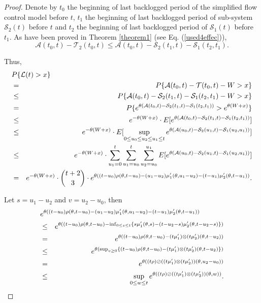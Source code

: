 \documentclass[12pt]{article}
\newtheorem{proof}{Proof}
\begin{document}
\begin{proof}
Denote by $t_0$ the beginning of last backlogged period of the simplified flow control model before $t$, $t_1$ the beginning of last backlogged period of sub-system $\mathcal{S}_2(t)$ before $t$ and $t_2$ the beginning of last backlogged period of $\mathcal{S}_1(t)$ before $t_1$. As have been proved in Theorem \ref{theorem1} (see Eq. (\ref{used4effec})),
$$\mathcal{A}(t_0,t)-\mathcal{T}_2(t_0,t) \leq \mathcal{A}(t_0,t)-\mathcal{S}_2(t_1,t)-\mathcal{S}_1(t_2,t_1).$$

Thus,
\begin{eqnarray*}
\lefteqn{P\{\mathcal{L}(t)>x\}}\\
&=&P\{\mathcal{A}(t_0,t)-\mathcal{T}(t_0,t)-W>x\}\\
&\leq&P\{\mathcal{A}(t_0,t)-\mathcal{S}_2(t_1,t)-\mathcal{S}_1(t_2,t_1)-W>x\}\\
&=&P\{e^{\theta(\mathcal{A}(t_0,t)-\mathcal{S}_2(t_1,t)-\mathcal{S}_1(t_2,t_1))}>e^{\theta(W+x)}\}\\
&\leq& e^{-\theta (W+x)}\cdot E[e^{\theta(\mathcal{A}(t_0,t)-\mathcal{S}_2(t_1,t)-\mathcal{S}_1(t_2,t_1))}]\\
&\leq& e^{-\theta (W+x)}\cdot E[\sup_{0\leq u_0\leq u_2\leq u_1\leq t}e^{\theta(\mathcal{A}(u_0,t)-\mathcal{S}_2(u_1,t)-\mathcal{S}_1(u_2,u_1))}]\\
&\leq& e^{-\theta (W+x)}\cdot \sum_{u_1=0}^t\sum_{u_1=u_0} ^t\sum_{u_2=u_0}^{u_1}E[e^{\theta(\mathcal{A}(u_0,t)-\mathcal{S}_2(u_1,t)-\mathcal{S}_1(u_2,u_1))}]\\
&=& e^{-\theta (W+x)}\cdot {t+2\choose 3}\cdot e^{\theta((t-u_0)\rho(\theta,t-u_0)-(u_1-u_2)\mu_1^\prime(\theta,u_1-u_2)-(t-u_1)\mu_2^\prime(\theta,t-u_1))}.
\end{eqnarray*}

Let $s=u_1-u_2$ and $v=u_2-u_0$, then
\begin{eqnarray*}
\lefteqn{e^{\theta((t-u_0)\rho(\theta,t-u_0)-(u_1-u_2)\mu_1^\prime(\theta,u_1-u_2)-(t-u_1)\mu_2^\prime(\theta,t-u_1))}}\\
&\leq & e^{\theta((t-u_0)\rho(\theta,t-u_0)-\inf_{0\leq s\leq t}\{s\mu_1^\prime(\theta,s)-(t-u_2-s)\mu_2^\prime(\theta,t-u_2-s)\})}\\
&=& e^{\theta((t-u_0)\rho(\theta,t-u_0)-(t\mu_1^\prime)\otimes(t\mu_2^\prime)(\theta,t-u_2))}\\
&\leq & e^{\theta(\sup_{v\geq 0}\{(t-u_0)\rho(\theta,t-u_0)-(t\mu_1^\prime)\otimes(t\mu_2^\prime)(\theta,t-u_2)\})}\\
&=& e^{\theta((t\rho)\oslash((t\mu_1^\prime)\otimes(t\mu_2^\prime))(\theta,u_2-u_0))}\\
&\leq& \sup_{0\leq w\leq t}e^{\theta((t\rho)\oslash((t\mu_1^\prime)\otimes(t\mu_2^\prime))(\theta,w))}.
\end{eqnarray*}


\end{proof}
\end{document}
